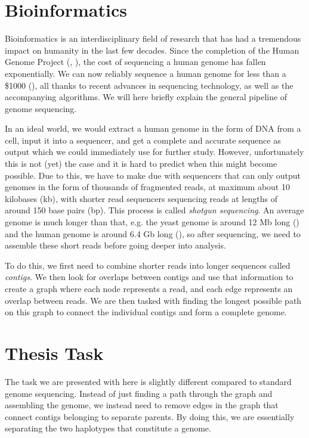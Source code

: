 \documentclass[times, utf8, diplomski, english]{fer_eng}
\begin{document}
\section{Bioinformatics}

Bioinformatics is an interdisciplinary field of research that has had a tremendous impact on humanity in the last few decades. Since the completion of the Human Genome Project (\cite{HGP1}, \cite{HGP2}), the cost of sequencing a human genome has fallen exponentially. We can now reliably sequence a human genome for less than a \$1000 (\cite{genome_cost}), all thanks to recent advances in sequencing technology, as well as the accompanying algorithms. We will here briefly explain the general pipeline of genome sequencing.

In an ideal world, we would extract a human genome in the form of DNA from a cell, input it into a sequencer, and get a complete and accurate sequence as output which we could immediately use for further study. However, unfortunately this is not (yet) the case and it is hard to predict when this might become possible. Due to this, we have to make due with sequencers that can only output genomes in the form of thousands of fragmented reads, at maximum about 10 kilobases (kb), with shorter read sequencers sequencing reads at lengths of around 150 base pairs (bp). This process is called \textit{shotgun sequencing}. An average genome is much longer than that, e.g. the yeast genome is around 12 Mb long (\cite{yeast}) and the human genome is around 6.4 Gb long (\cite{human}), so after sequencing, we need to assemble these short reads before going deeper into analysis.

To do this, we first need to combine shorter reads into longer sequences called \textit{contigs}. We then look for overlaps between contigs and use that information to create a graph where each node represents a read, and each edge represents an overlap between reads. We are then tasked with finding the longest possible path on this graph to connect the individual contigs and form a complete genome.

\section{Thesis Task}

The task we are presented with here is slightly different compared to standard genome sequencing. Instead of just finding a path through the graph and assembling the genome, we instead need to remove edges in the graph that connect contigs belonging to separate parents. By doing this, we are essentially separating the two haplotypes that constitute a genome.
\end{document}
